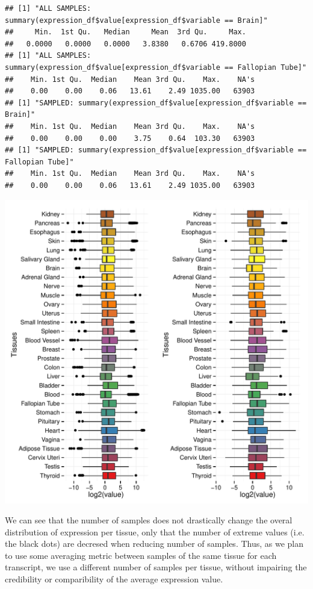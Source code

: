 \documentclass{article}\usepackage[]{graphicx}\usepackage[]{color}
\makeatletter
\def\maxwidth{ %
  \ifdim\Gin@nat@width>\linewidth
    \linewidth
  \else
    \Gin@nat@width
  \fi
}
\newenvironment{kframe}{%
 \def\at@end@of@kframe{}%
 \ifinner\ifhmode%
  \def\at@end@of@kframe{\end{minipage}}%
  \begin{minipage}{\columnwidth}%
 \fi\fi%
 \def\FrameCommand##1{\hskip\@totalleftmargin \hskip-\fboxsep
 \colorbox{shadecolor}{##1}\hskip-\fboxsep
     \hskip-\linewidth \hskip-\@totalleftmargin \hskip\columnwidth}%
 \MakeFramed {\advance\hsize-\width
   \@totalleftmargin\z@ \linewidth\hsize
   \@setminipage}}%
 {\par\unskip\endMakeFramed%
 \at@end@of@kframe}
\newenvironment{knitrout}{}{} %
\makeatother
\begin{document}
\begin{knitrout}
\color{fgcolor}\begin{kframe}
\begin{verbatim}
## [1] "ALL SAMPLES: summary(expression_df$value[expression_df$variable == Brain]"
##     Min.  1st Qu.   Median     Mean  3rd Qu.     Max. 
##   0.0000   0.0000   0.0000   3.8380   0.6706 419.8000 
## [1] "ALL SAMPLES: summary(expression_df$value[expression_df$variable == Fallopian Tube]"
##    Min. 1st Qu.  Median    Mean 3rd Qu.    Max.    NA's 
##    0.00    0.00    0.06   13.61    2.49 1035.00   63903 
## [1] "SAMPLED: summary(expression_df$value[expression_df$variable == Brain]"
##    Min. 1st Qu.  Median    Mean 3rd Qu.    Max.    NA's 
##    0.00    0.00    0.00    3.75    0.64  103.30   63903 
## [1] "SAMPLED: summary(expression_df$value[expression_df$variable == Fallopian Tube]"
##    Min. 1st Qu.  Median    Mean 3rd Qu.    Max.    NA's 
##    0.00    0.00    0.06   13.61    2.49 1035.00   63903
\end{verbatim}
\end{kframe}
\includegraphics[width=\maxwidth]{figure/expression_per_tissue-1} 

\end{knitrout}

We can see that the number of samples does not drastically change the overal distribution of expression per tissue, only that the number of extreme values (i.e. the black dots) are decresed when reducing number of samples. Thus, as we plan to use some averaging metric between samples of the same tissue for each transcript, we use a different number of samples per tissue, without impairing the credibility or comparibility of the average expression value.
\end{document}
